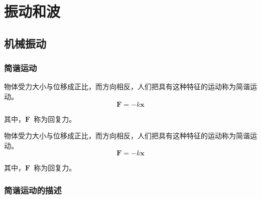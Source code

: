 \documentclass[color=purple,openany]{textbook-cn}
\begin{document}
\part{振动和波}


\chaptersaying{\lipsum[1][9]}
\chapter{机械振动}


\begin{Block}[章节引入]
\lipsum[1-3]
\end{Block}

\section{简谐运动}
\begin{Point}
\lipsum[2]
\end{Point}

\begin{Case}
\item \lipsum[1][3]
\item \lipsum[1][3]
\item \lipsum[1][3]
\item \lipsum[1][3]
\end{Case}

\begin{Link}
\zhlipsum[1]
\end{Link}

\begin{Definition}[简谐运动]
物体受力大小与位移成正比，而方向相反，人们把具有这种特征的运动称为简谐运动。
\begin{equation*}
\bm F=-k\bm x
\end{equation*}\par
其中，$\bm F$~称为回复力。
\end{Definition}

\begin{Definition*}[简谐运动]
物体受力大小与位移成正比，而方向相反，人们把具有这种特征的运动称为简谐运动。
\begin{equation*}
\bm F=-k\bm x
\end{equation*}\par
其中，$\bm F$~称为回复力。
\end{Definition*}



\section{简谐运动的描述}
\begin{Point}
\lipsum[2]
\end{Point}
\end{document}
